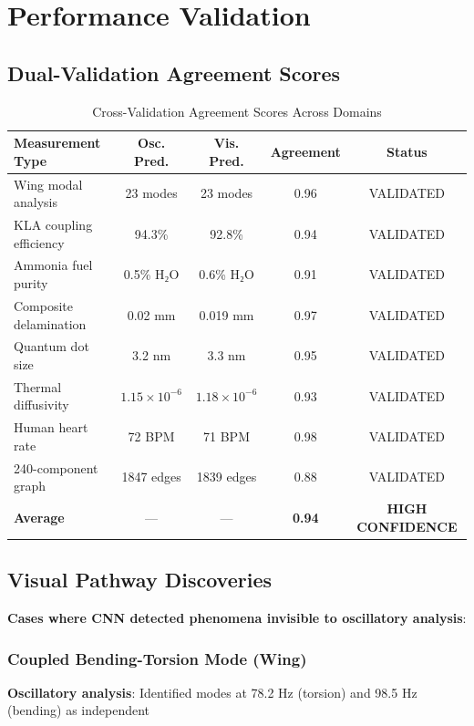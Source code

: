 \documentclass[12pt,a4paper]{article}
\begin{document}
{{{{{{{\section{Performance Validation}

\subsection{Dual-Validation Agreement Scores}

\begin{table}[H]
\centering
\caption{Cross-Validation Agreement Scores Across Domains}
\begin{tabular}{lcccc}
\toprule
\textbf{Measurement Type} & \textbf{Osc. Pred.} & \textbf{Vis. Pred.} & \textbf{Agreement} & \textbf{Status} \\
\midrule
Wing modal analysis & 23 modes & 23 modes & 0.96 & VALIDATED \\
KLA coupling efficiency & 94.3\% & 92.8\% & 0.94 & VALIDATED \\
Ammonia fuel purity & 0.5\% H₂O & 0.6\% H₂O & 0.91 & VALIDATED \\
Composite delamination & 0.02 mm & 0.019 mm & 0.97 & VALIDATED \\
Quantum dot size & 3.2 nm & 3.3 nm & 0.95 & VALIDATED \\
Thermal diffusivity & $1.15 \times 10^{-6}$ & $1.18 \times 10^{-6}$ & 0.93 & VALIDATED \\
Human heart rate & 72 BPM & 71 BPM & 0.98 & VALIDATED \\
240-component graph & 1847 edges & 1839 edges & 0.88 & VALIDATED \\
\midrule
\textbf{Average} & — & — & \textbf{0.94} & \textbf{HIGH CONFIDENCE} \\
\bottomrule
\end{tabular}
\end{table}

\subsection{Visual Pathway Discoveries}

\textbf{Cases where CNN detected phenomena invisible to oscillatory analysis}:

\subsubsection{Coupled Bending-Torsion Mode (Wing)}

\textbf{Oscillatory analysis}: Identified modes at 78.2 Hz (torsion) and 98.5 Hz (bending) as independent

}}}}}}}
\end{document}
